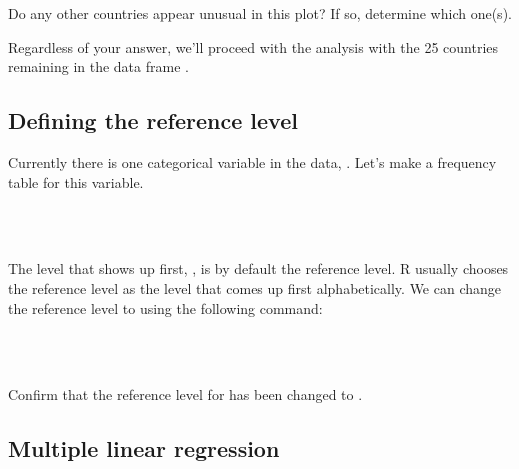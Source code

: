 \documentclass[11pt]{article}
\begin{document}
\begin{exercise}
Do any other countries appear unusual in this plot? If so, determine which one(s).
\end{exercise}

Regardless of your answer, we'll proceed with the analysis with the 25 countries remaining in the data frame \texttt{}.

\subsection*{Defining the reference level}

Currently there is one categorical variable in the data, \texttt{}. Let's make a frequency table for this variable.

\ttfamily\noindent
\hlstd{}\hspace*{\fill}\\
\hlstd{}\hlkeyword{(}\hlkeyword{\usebox{\hlnormalsizeboxdollar}}\hlkeyword{)}\hspace*{\fill}\\
\normalfont

The level that shows up first, \texttt{}, is by default the reference level. R usually chooses the reference level as the level that comes up first alphabetically. We can change the reference level to \texttt{} using the following command:

\ttfamily\noindent
\hlstd{}\hspace*{\fill}\\
\hlstd{}\hlkeyword{\usebox{\hlnormalsizeboxdollar}}\hlassignement{=}{\ }\hlkeyword{(}\hlkeyword{\usebox{\hlnormalsizeboxdollar}}\hlkeyword{,}{\ }\hlargument{=}{\ }\hlkeyword{)}\hspace*{\fill}\\
\normalfont

\begin{exercise}
Confirm that the reference level for \texttt{} has been changed to \texttt{}.
\end{exercise}

\subsection*{Multiple linear regression}
\end{document}
